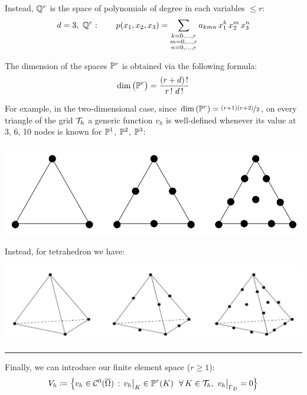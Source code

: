 Instead, $\mathbb{Q}^r$ is the space of polynomials of degree in each variables $\leq r$:
\begin{equation*}
d=3,\ \mathbb{Q}^r:\qquad p(x_1,x_2,x_3)=\sum_{\substack{k=0,\dots,r \\
m=0,\dots,r \\
n=0,\dots,r} }  a_{kmn}\, x_1^k \, x_2^m\, x_3^n
\end{equation*}

The dimension of the spaces $\mathbb{P}^r$ is obtained via the following formula:
\begin{equation*}
\text{dim}\,\big(\PP^r\big)=\frac{(r+d)\,!}{r\,!\ d\,!} 
\end{equation*}

For example, in the two-dimensional case, since $\text{dim}\left( \mathbb{P}^r \right)=\nicefrac{(r+1)(r+2)}{2}$, on every triangle of the grid $\mathcal{T}_h$ a generic function $v_h$ is well-defined whenever its value at 3, 6, 10 nodes is known for $\mathbb{P}^1$, $\mathbb{P}^2$, $\mathbb{P}^3$:
\begin{Figure}
    \centering
    \includegraphics[width=0.7\linewidth]{images/tr1}
\end{Figure}

Instead, for tetrahedron we have:
\begin{Figure}
    \centering
    \includegraphics[width=0.8\linewidth]{images/tr2}
\end{Figure}

\rule{0.47\textwidth}{0.2pt}

Finally, we can introduce our finite element space ($r\geq 1$):
\begin{equation*}
V_h\coloneq \left\{ v_h\in\Cc^0(\overline{\Omega})\,:\,v_h\big|_{K}\in\PP^r(K)\ \ \forall\,K\in\Tc_h,\ v_h\big|_{\Gamma_D}=0  \right\}
\end{equation*}

